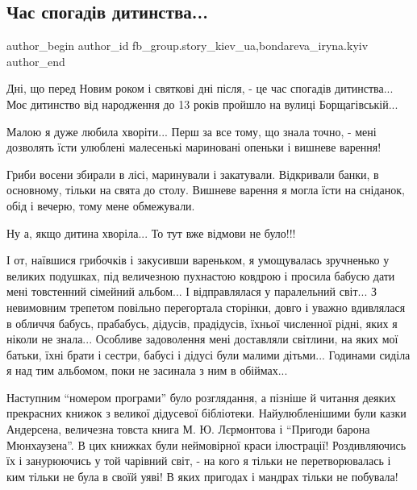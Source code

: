  
 
 
 
 
 
\subsection{Час спогадів дитинства...}
\label{sec:14_01_2022.fb.fb_group.story_kiev_ua.3.detstvo}
 
\ifcmt
 author_begin
   author_id fb_group.story_kiev_ua,bondareva_iryna.kyiv
 author_end
\fi

Дні, що перед Новим роком і святкові дні після, - це час спогадів
дитинства... Моє дитинство від народження до 13 років пройшло на вулиці
Борщагівській...

Малою я дуже любила хворіти... Перш за все тому, що знала точно, - мені
дозволять їсти улюблені малесенькі мариновані опеньки і вишневе варення! 


Гриби восени збирали в лісі, маринували і закатували. Відкривали банки, в
основному, тільки на свята до столу. Вишневе варення я могла їсти на сніданок,
обід і вечерю, тому мене обмежували. 

Ну а, якщо дитина хворіла... То тут вже відмови не було!!! 

І от, наївшися грибочків і закусивши вареньком, я умощувалась зручненько у
великих подушках, під величезною пухнастою ковдрою і просила бабусю дати мені
товстенний сімейний альбом... І відправлялася у паралельний світ... З
невимовним трепетом повільно перегортала сторінки, довго і уважно вдивлялася в
обличчя бабусь, прабабусь, дідусів, прадідусів, їхньої численної рідні, яких я
ніколи не знала... Особливе задоволення мені доставляли світлини, на яких мої
батьки, їхні брати і сестри, бабусі і дідусі були малими дітьми... Годинами
сиділа я над тим альбомом, поки не засинала з ним в обіймах... 

Наступним  \enquote{номером програми} було розглядання, а пізніше й читання деяких
прекрасних книжок з великої дідусевої бібліотеки. Найулюбленішими були казки
Андерсена, величезна товста книга  М. Ю.  Лєрмонтова і  \enquote{Пригоди барона
Мюнхаузена}. В цих книжках були неймовірної краси ілюстрації! Роздивляючись їх
і занурюючись у той чарівний світ, - на кого я тільки не перетворювалась і ким
тільки не була в своїй уяві! В яких пригодах і мандрах тільки не побувала! 

